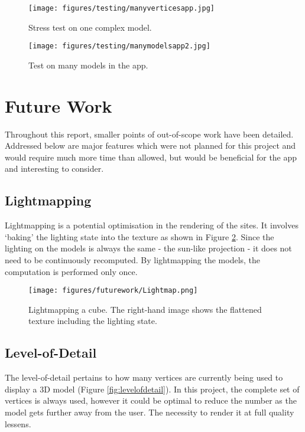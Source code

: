 \documentclass[12pt, a4paper]{article}
\begin{document}
\begin{figure}[H]
\centering
\begin{minipage}{.5\textwidth}
  \centering
  \texttt{[image: figures/testing/manyverticesapp.jpg]}
    \caption{Stress test on one complex model.}
  \label{fig:manyverticesapp}
\end{minipage}%
\begin{minipage}{.5\textwidth}
  \centering
  \texttt{[image: figures/testing/manymodelsapp2.jpg]}
  \caption{Test on many models in the app.}
    \label{fig:manymodelsapp}
\end{minipage}
\end{figure}

\section{Future Work}
\label{futurework}
Throughout this report, smaller points of out-of-scope work have been detailed. Addressed below are major features which were not planned for this project and would require much more time than allowed, but would be beneficial for the app and interesting to consider.

\subsection{Lightmapping}
Lightmapping is a potential optimisation in the rendering of the sites. It involves `baking' the lighting state into the texture as shown in Figure \ref{fig:lightmapping}. Since the lighting on the models is always the same - the sun-like projection - it does not need to be continuously recomputed. By lightmapping the models, the computation is performed only once.

\begin{figure}
\centering
    \texttt{[image: figures/futurework/Lightmap.png]}
        \caption{Lightmapping a cube. The right-hand image shows the flattened texture including the lighting state. \cite{futurework:lightmapping}}
        \label{fig:lightmapping}
\end{figure}

\subsection{Level-of-Detail}
The level-of-detail pertains to how many vertices are currently being used to display a 3D model (Figure \ref{fig:levelofdetail}). In this project, the complete set of vertices is always used, however it could be optimal to reduce the number as the model gets further away from the user. The necessity to render it at full quality lessens. 
\end{document}
